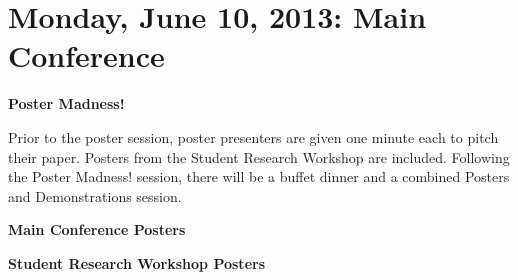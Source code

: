 \chapter{Monday, June 10, 2013: Main Conference}
\thispagestyle{emptyheader}

\newpage
\newpage


\newpage



\vspace{1em}\par\centerline{\bfseries\Large Poster Madness!}\vspace{1em}\par
{}

Prior to the poster session, poster presenters are given one minute each to pitch their
paper. Posters from the Student Research Workshop are included. Following the Poster Madness!
session, there will be a buffet dinner and a combined Posters and Demonstrations session.

\noindent
\vspace{1em}\par\centerline{\bfseries\large Main Conference Posters}\vspace{1em}\par


\noindent
\vspace{1em}\par\centerline{\bfseries\large Student Research Workshop Posters}\vspace{1em}\par
\noindent


